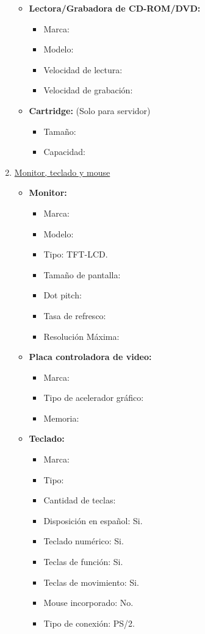 \begin{enumerate}
\begin{itemize}
    \item \textbf{Lectora/Grabadora de CD-ROM/DVD:}
    \begin{itemize}
      \item Marca:
      \item Modelo:
      \item Velocidad de lectura:
      \item Velocidad de grabación:
    \end{itemize}
    
    \item \textbf{Cartridge:} (Solo para servidor)
    \begin{itemize}
      \item Tamaño:
      \item Capacidad:
    \end{itemize}
  \end{itemize}
  
  \item \underline{Monitor, teclado y mouse}
  \begin{itemize}
    \item \textbf{Monitor:}
    \begin{itemize}
      \item Marca:
      \item Modelo:
      \item Tipo: TFT-LCD.
      \item Tamaño de pantalla:
      \item Dot pitch:
      \item Tasa de refresco:
      \item Resolución Máxima:
    \end{itemize}
    
    \item \textbf{Placa controladora de video:}
    \begin{itemize}
      \item Marca:
      \item Tipo de acelerador gráfico:
      \item Memoria:
    \end{itemize}
    
    \item \textbf{Teclado:}
    \begin{itemize}
      \item Marca:
      \item Tipo:
      \item Cantidad de teclas:
      \item Disposición en español: Si.
      \item Teclado numérico: Si.
      \item Teclas de función: Si.
      \item Teclas de movimiento: Si.
      \item Mouse incorporado: No.
      \item Tipo de conexión: PS/2.
    \end{itemize}
    

\end{itemize}
\end{enumerate}
